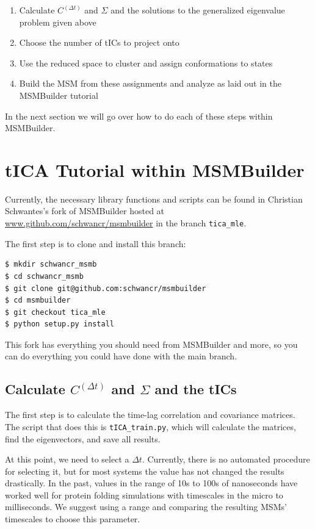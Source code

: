\documentclass[12pt]{article}
\begin{document}
\begin{enumerate}
\item Calculate $C^{(\Delta t)}$ and $\Sigma$ and the solutions to the generalized eigenvalue problem given above
\item Choose the number of tICs to project onto
\item Use the reduced space to cluster and assign conformations to states
\item Build the MSM from these assignments and analyze as laid out in the MSMBuilder tutorial
\end{enumerate}

In the next section we will go over how to do each of these steps within MSMBuilder.

\section{tICA Tutorial within MSMBuilder}

Currently, the necessary library functions and scripts can be found in Christian Schwantes's fork of MSMBuilder hosted at \url{www.github.com/schwancr/msmbuilder} in the branch \texttt{tica\_mle}. 

The first step is to clone and install this branch:

\begin{verbatim}
$ mkdir schwancr_msmb
$ cd schwancr_msmb
$ git clone git@github.com:schwancr/msmbuilder
$ cd msmbuilder
$ git checkout tica_mle
$ python setup.py install
\end{verbatim}

This fork has everything you should need from MSMBuilder and more, so you can do everything you could have done with the main branch.

\subsection{Calculate $C^{(\Delta t)}$ and $\Sigma$ and the tICs}

The first step is to calculate the time-lag correlation and covariance matrices. The script that does this is \texttt{tICA\_train.py}, which will calculate the matrices, find the eigenvectors, and save all results.

At this point, we need to select a $\Delta t$. Currently, there is no automated procedure for selecting it, but for most systems the value has not changed the results drastically. In the past, values in the range of 10s to 100s of nanoseconds have worked well for protein folding simulations with timescales in the micro to milliseconds. We suggest using a range and comparing the resulting MSMs' timescales to choose this parameter.
\end{document}
